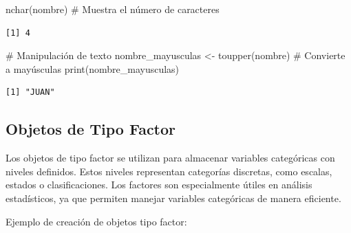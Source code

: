 \documentclass[
  spanish,
  a4paper,
  DIV=11,
  numbers=noendperiod,
  onepage,
  openany]{scrreprt}
\newenvironment{Shaded}{\begin{snugshade}}{\end{snugshade}}
\newcommand{\CommentTok}[1]{\textcolor[rgb]{0.37,0.37,0.37}{#1}}
\newcommand{\FunctionTok}[1]{\textcolor[rgb]{0.28,0.35,0.67}{#1}}
\newcommand{\NormalTok}[1]{\textcolor[rgb]{0.00,0.23,0.31}{#1}}
\newcommand{\OtherTok}[1]{\textcolor[rgb]{0.00,0.23,0.31}{#1}}
\begin{document}
\begin{Shaded}
\begin{Highlighting}[]
\FunctionTok{nchar}\NormalTok{(nombre)          }\CommentTok{\# Muestra el número de caracteres}
\end{Highlighting}
\end{Shaded}

\begin{verbatim}
[1] 4
\end{verbatim}

\begin{Shaded}
\begin{Highlighting}[]
\CommentTok{\# Manipulación de texto}
\NormalTok{nombre\_mayusculas }\OtherTok{\textless{}{-}} \FunctionTok{toupper}\NormalTok{(nombre)  }\CommentTok{\# Convierte a mayúsculas}
\FunctionTok{print}\NormalTok{(nombre\_mayusculas)}
\end{Highlighting}
\end{Shaded}

\begin{verbatim}
[1] "JUAN"
\end{verbatim}

\subsection{Objetos de Tipo Factor}\label{objetos-de-tipo-factor}

Los objetos de tipo factor se utilizan para almacenar variables
categóricas con niveles definidos. Estos niveles representan categorías
discretas, como escalas, estados o clasificaciones. Los factores son
especialmente útiles en análisis estadísticos, ya que permiten manejar
variables categóricas de manera eficiente.

Ejemplo de creación de objetos tipo factor:
\end{document}

